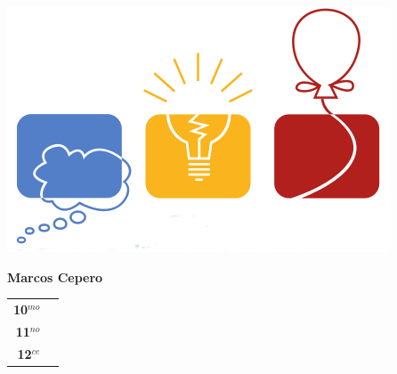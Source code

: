 \begin{minipage}{0.2\textwidth}
	\includegraphics[width=\linewidth]{img/icpc.png} %
\end{minipage}
\hfill
\begin{minipage}{0.7\textwidth}
	\textbf{Marcos Cepero}
	
	\vspace*{0.1in}
	\begin{tabular}{rl}
		
		\textbf{10$^{mo}$} &   \\
		
		\textbf{11$^{no}$} &  \\
		
		\textbf{12$^{ce}$} &   \\
		
		
	\end{tabular}
	
\end{minipage}

